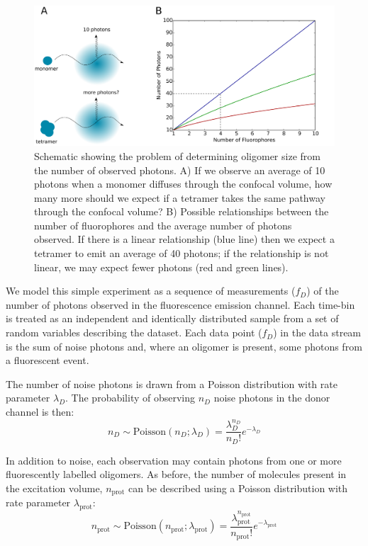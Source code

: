 \begin{figure}
   \begin{center}
      \includegraphics*[clip=true, width=6in]{sizing/multimer_emission.pdf}
      \caption{Schematic showing the problem of determining oligomer size from the number of observed photons. A) If we observe an average of 10 photons when a monomer diffuses through the confocal volume, how many more should we expect if a tetramer takes the same pathway through the confocal volume? B) Possible relationships between the number of fluorophores and the average number of photons observed. If there is a linear relationship (blue line) then we expect a tetramer to emit an average of 40 photons; if the relationship is not linear, we may expect fewer photons (red and green lines).}
      \label{fig:oligomers}
   \end{center}
\end{figure}

We model this simple experiment as a sequence of measurements ($f_D$) of the number of photons observed in the fluorescence emission channel. Each time-bin is treated as an independent and identically distributed sample from a set of random variables describing the dataset. Each data point ($f_D$) in the data stream is the sum of noise photons and, where an oligomer is present, some photons from a fluorescent event. 

The number of noise photons is drawn from a Poisson distribution with rate parameter $\lambda_D$. The probability of observing $n_D$ noise photons in the donor channel is then:
\begin{equation}
n_{D} \sim \text{Poisson}(n_{D}; \lambda_{D}) = \frac{\lambda_{D}^{n_{D}}}{n_{D}!}e^{-\lambda_{D}}
\end{equation}

In addition to noise, each observation may contain photons from one or more fluorescently labelled oligomers.  As before, the number of molecules present in the excitation volume, $n_{\text{prot}}$ can be described using a Poisson distribution with rate parameter $\lambda_{\text{prot}}$:
\begin{equation}
n_{\text{prot}} \sim \text{Poisson}(n_{\text{prot}}; \lambda_{\text{prot}}) = \frac{\lambda_{\text{prot}}^{n_{\text{prot}}}}{n_{\text{prot}}!}e^{-\lambda_{\text{prot}}}
\label{eq:nprot}
\end{equation}


